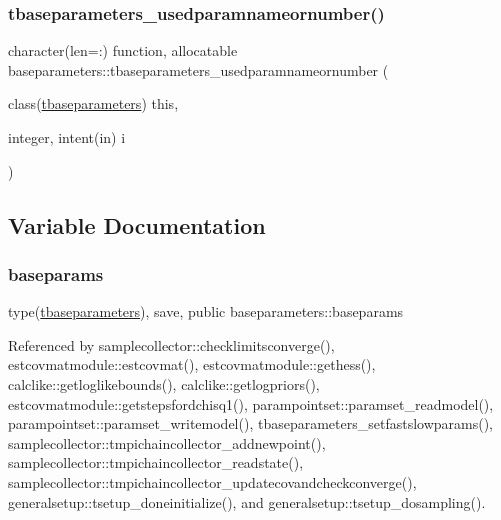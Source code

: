 \subsubsection{\texorpdfstring{tbaseparameters\+\_\+usedparamnameornumber()}{tbaseparameters\_usedparamnameornumber()}}
{\footnotesize\ttfamily character(len=\+:) function, allocatable baseparameters\+::tbaseparameters\+\_\+usedparamnameornumber (\begin{DoxyParamCaption}\item[{class(\mbox{\hyperlink{structbaseparameters_1_1tbaseparameters}{tbaseparameters}})}]{this,  }\item[{integer, intent(in)}]{i }\end{DoxyParamCaption})\hspace{0.3cm}{\ttfamily [private]}}



\subsection{Variable Documentation}
\mbox{\label{namespacebaseparameters_abc9ecfbbf4a5012fbc95d3fb51a1e6e3}} 
\subsubsection{\texorpdfstring{baseparams}{baseparams}}
{\footnotesize\ttfamily type(\mbox{\hyperlink{structbaseparameters_1_1tbaseparameters}{tbaseparameters}}), save, public baseparameters\+::baseparams}



Referenced by samplecollector\+::checklimitsconverge(), estcovmatmodule\+::estcovmat(), estcovmatmodule\+::gethess(), calclike\+::getloglikebounds(), calclike\+::getlogpriors(), estcovmatmodule\+::getstepsfordchisq1(), parampointset\+::paramset\+\_\+readmodel(), parampointset\+::paramset\+\_\+writemodel(), tbaseparameters\+\_\+setfastslowparams(), samplecollector\+::tmpichaincollector\+\_\+addnewpoint(), samplecollector\+::tmpichaincollector\+\_\+readstate(), samplecollector\+::tmpichaincollector\+\_\+updatecovandcheckconverge(), generalsetup\+::tsetup\+\_\+doneinitialize(), and generalsetup\+::tsetup\+\_\+dosampling().

\mbox{\label{namespacebaseparameters_a1d3e10105684d9171cdfec4ccfcd331d}} 
